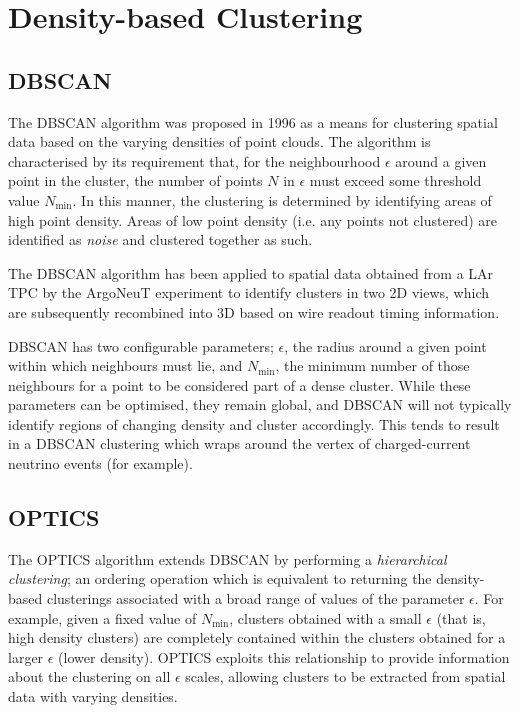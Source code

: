 \section{Density-based Clustering}
\subsection{\acs{DBSCAN}}\label{sec:latte_dbscan}
The \ac{DBSCAN} algorithm was proposed in 1996 as a means for clustering spatial data based on the varying densities of point clouds\citep{Ester1996}. The algorithm is characterised by its requirement that, for the neighbourhood $\epsilon$ around a given point in the cluster, the number of points $N$ in $\epsilon$ must exceed some threshold value $N_\mathrm{min}$. In this manner, the clustering is determined by identifying areas of high point density. Areas of low point density (i.e. any points not clustered) are identified as \emph{noise} and clustered together as such.

The \ac{DBSCAN} algorithm has been applied to spatial data obtained from a \ac{LAr TPC} by the ArgoNeuT experiment\cite{Spitz2011} to identify clusters in two 2D views, which are subsequently recombined into 3D based on wire readout timing information.

\ac{DBSCAN} has two configurable parameters; $\epsilon$, the radius around a given point within which neighbours must lie, and $N_\mathrm{min}$, the minimum number of those neighbours for a point to be considered part of a dense cluster. While these parameters can be optimised, they remain global, and \ac{DBSCAN} will not typically identify regions of changing density and cluster accordingly. This tends to result in a \ac{DBSCAN} clustering which wraps around the vertex of charged-current neutrino events (for example).

\subsection{\acs{OPTICS}}
The \ac{OPTICS} algorithm\citep{Ankerst1999} extends \ac{DBSCAN} by performing a \emph{hierarchical clustering}; an ordering operation which is equivalent to returning the density-based clusterings associated with a broad range of values of the parameter $\epsilon$. For example, given a fixed value of $N_\mathrm{min}$, clusters obtained with a small $\epsilon$ (that is, high density clusters) are completely contained within the clusters obtained for a larger $\epsilon$ (lower density). \ac{OPTICS} exploits this relationship to provide information about the clustering on all $\epsilon$ scales, allowing clusters to be extracted from spatial data with varying densities.

